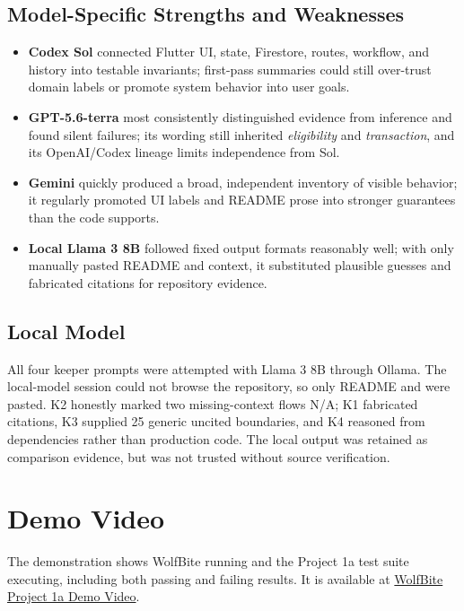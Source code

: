 \documentclass[sigconf]{acmart}
\begin{document}
\subsection{Model-Specific Strengths and Weaknesses}

\begin{itemize}
  \item \textbf{Codex Sol} connected Flutter UI, state, Firestore, routes,
  workflow, and history into testable invariants; first-pass summaries could
  still over-trust domain labels or promote system behavior into user goals.
  \item \textbf{GPT-5.6-terra} most consistently distinguished evidence from
  inference and found silent failures; its wording still inherited
  \emph{eligibility} and \emph{transaction}, and its OpenAI/Codex lineage
  limits independence from Sol.
  \item \textbf{Gemini} quickly produced a broad, independent inventory of
  visible behavior; it regularly promoted UI labels and README prose into
  stronger guarantees than the code supports.
  \item \textbf{Local Llama 3 8B} followed fixed output formats reasonably
  well; with only manually pasted README and  context, it
  substituted plausible guesses and fabricated citations for repository
  evidence.
\end{itemize}

\subsection{Local Model}

All four keeper prompts were attempted with Llama 3 8B through Ollama. The
local-model session could not browse the repository, so only README and
 were pasted. K2 honestly marked two missing-context flows
N/A; K1 fabricated citations, K3 supplied 25 generic uncited boundaries, and
K4 reasoned from dependencies rather than production code. The local output
was retained as comparison evidence, but was not trusted without source
verification.

\section{Demo Video}

The demonstration shows WolfBite running and the Project 1a test suite
executing, including both passing and failing results. It is available at
\href{https://github.com/closeabigaile/SEf26_project/blob/b305f53b39b6edbcd82c1117e4cde536c6ad7b42/Project1a_Work/video/proj1a_video.mp4}
{WolfBite Project 1a Demo Video}.
\end{document}
